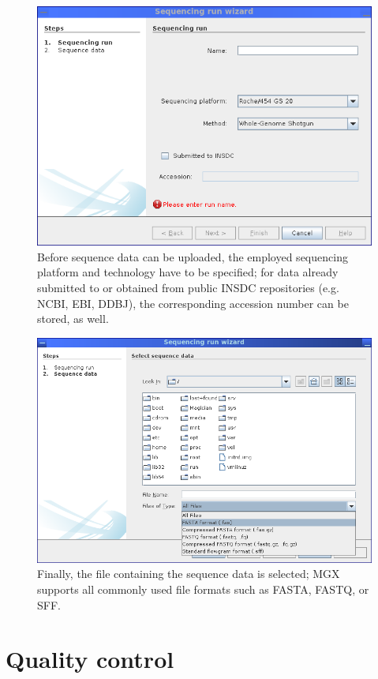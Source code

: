 \begin{figure}[H]
\centering
\includegraphics[width=.8\textwidth]{img/mgx/runwiz1}
\caption[Sequence import]{Before sequence data can be uploaded, the employed sequencing platform and technology have 
to be specified; for data already submitted to or obtained from public INSDC repositories (e.g. NCBI, EBI, DDBJ), the
corresponding accession number can be stored, as well.}
\label{dnawiz1}
\end{figure}

\begin{figure}[H]
\centering
\includegraphics[width=.8\textwidth]{img/mgx/runwiz2}
\caption[Sequence import]{Finally, the file containing the sequence data is selected; MGX supports all commonly used
file formats such as FASTA, FASTQ, or SFF.}
\label{dnawiz2}
\end{figure}

\section{Quality control}

